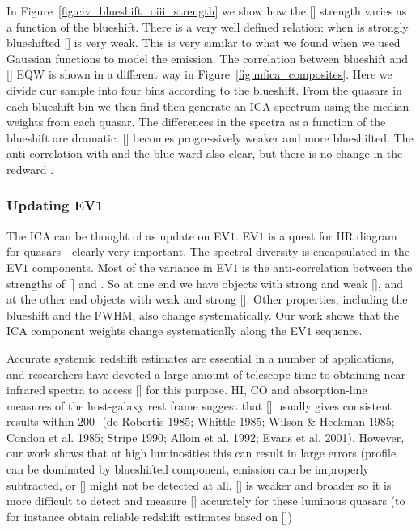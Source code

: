 In Figure~\ref{fig:civ_blueshift_oiii_strength} we show how the [] strength varies as a function of the  blueshift. 
There is a very well defined relation: when  is strongly blueshifted [] is very weak. 
This is very similar to what we found when we used Gaussian functions to model the emission. 
The correlation between  blueshift and [] EQW is shown in a different way in Figure~\ref{fig:mfica_composites}. 
Here we divide our sample into four bins according to the  blueshift. 
From the quasars in each  blueshift bin we then find then generate an ICA spectrum using the median weights from each quasar. 
The differences in the spectra as a function of the  blueshift are dramatic. 
[] becomes progressively weaker and more blueshifted.
The anti-correlation with  and the blue-ward  also clear, but there is no change in the redward . 

\subsubsection{Updating EV1}

The ICA can be thought of as update on EV$1$.
EV$1$ is a quest for HR diagram for quasars - clearly very important.  
The spectral diversity is encapsulated in the EV$1$ components. 
Most of the variance in EV$1$ is the anti-correlation between the strengths of [] and . 
So at one end we have objects with strong  and weak [], and at the other end objects with weak  and strong []. 
Other properties, including the  blueshift and the \hb FWHM, also change systematically. 
Our work shows that the ICA component weights change systematically along the EV$1$ sequence. 


Accurate systemic redshift estimates are essential in a number of applications, and researchers have devoted a large amount of telescope time to obtaining near-infrared spectra to access [] for this purpose. 
HI, CO and absorption-line measures of the host-galaxy rest frame suggest that [] usually gives consistent results within $200$\,\kms\, (de Robertis 1985; Whittle 1985; Wilson \& Heckman 1985; Condon et al. 1985; Stripe 1990; Alloin et al. 1992; Evans et al. 2001).  
However, our work shows that at high luminosities this can result in large errors (profile can be dominated by blueshifted component,  emission can be improperly subtracted, or [] might not be detected at all. 
[] is weaker and broader so it is more difficult to detect and measure [] accurately for these luminous quasars (to for instance obtain reliable redshift estimates based on [])

